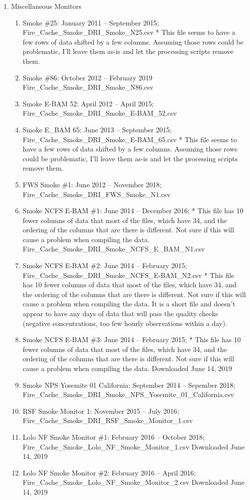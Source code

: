 \begin{enumerate}
\item Miscellaneous Monitors
\begin{enumerate}[nolistsep]
\item Smoke \#25: January 2011 -- September 2015; Fire\_Cache\_Smoke\_DRI\_Smoke\_N25.csv * This file seems to have a few rows of data shifted by a few columns. Assuming those rows could be problematic, I'll leave them as-is and let the processing scripts remove them.
\item Smoke \#86: October 2012 -- February 2019 Fire\_Cache\_Smoke\_DRI\_Smoke\_N86.csv
\item Smoke E-BAM 52: April 2012 -- April 2015; Fire\_Cache\_Smoke\_DRI\_Smoke\_E-BAM\_52.csv
\item Smoke E\_BAM 65: June 2013 -- September 2015; Fire\_Cache\_Smoke\_DRI\_Smoke\_E-BAM\_65.csv * This file seems to have a few rows of data shifted by a few columns. Assuming those rows could be problematic, I'll leave them as-is and let the processing scripts remove them.
\item FWS Smoke \#1: June 2012 -- November 2018; Fire\_Cache\_Smoke\_DRI\_FWS\_Smoke\_N1.csv
\item Smoke NCFS E-BAM \#1: June 2014 -- December 2016; * This file has 10 fewer columns of data that most of the files, which have 34, and the ordering of the columns that are there is different. Not sure if this will cause a problem when compiling the data. Fire\_Cache\_Smoke\_DRI\_Smoke\_NCFS\_E\_BAM\_N1.csv
\item Smoke NCFS E-BAM \#2: June 2014 -- February 2015; Fire\_Cache\_Smoke\_DRI\_Smoke\_NCFS\_E-BAM\_N2.csv * This file has 10 fewer columns of data that most of the files, which have 34, and the ordering of the columns that are there is different. Not sure if this will cause a problem when compiling the data. It is a short file and doesn't appear to have any days of data that will pass the quality checks (negative concentrations, too few hourly observations within a day).
\item Smoke NCFS E-BAM \#3: June 2014 -- February 2015; * This file has 10 fewer columns of data that most of the files, which have 34, and the ordering of the columns that are there is different. Not sure if this will cause a problem when compiling the data. Downloaded June 14, 2019 %
\item Smoke NPS Yosemite 01 California: September 2014 -- Sepember 2018; Fire\_Cache\_Smoke\_DRI\_Smoke\_NPS\_Yosemite\_01\_California.csv
\item RSF Smoke Monitor 1: November 2015 -- July 2016; Fire\_Cache\_Smoke\_DRI\_RSF\_Smoke\_Monitor\_1.csv
\item Lolo NF Smoke Monitor \#1: February 2016 -- October 2018;  Fire\_Cache\_Smoke\_Lolo\_NF\_Smoke\_Monitor\_1.csv Downloaded June 14, 2019 %
\item Lolo NF Smoke Monitor \#2: February 2016 -- April 2016; Fire\_Cache\_Smoke\_Lolo\_NF\_Smoke\_Monitor\_2.csv Downloaded June 14, 2019 %
\end{enumerate}
\end{enumerate}
